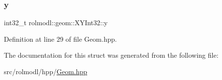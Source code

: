 \subsubsection{\texorpdfstring{y}{y}}
{\footnotesize\ttfamily int32\+\_\+t rolmodl\+::geom\+::\+X\+Y\+Int32\+::y}



Definition at line 29 of file Geom.\+hpp.



The documentation for this struct was generated from the following file\+:\begin{DoxyCompactItemize}
\item 
src/rolmodl/hpp/\mbox{\hyperlink{_geom_8hpp}{Geom.\+hpp}}\end{DoxyCompactItemize}
